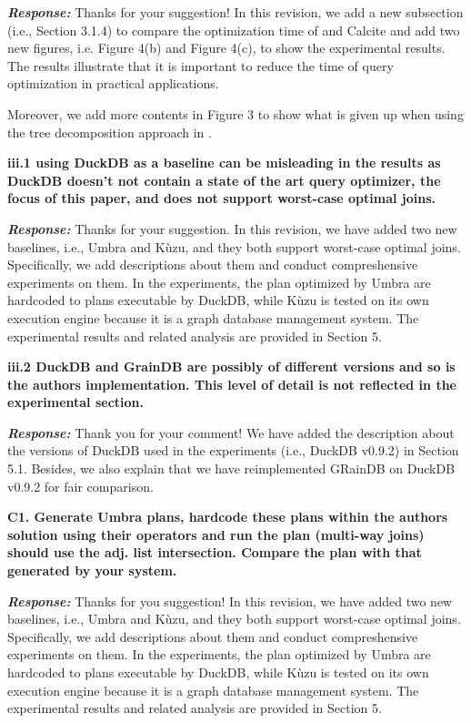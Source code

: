 \textbf{\textit{Response: }}
Thanks for your suggestion! In this revision, we add a new subsection (i.e., Section 3.1.4) to compare the optimization time of \name and Calcite and add two new figures, i.e. Figure 4(b) and Figure 4(c), to show the experimental results.
The results illustrate that it is important to reduce the time of query optimization in practical applications. 

Moreover, we add more contents in Figure 3 to show what is given up when using the tree decomposition approach in \name.


\textbf{
iii.1 using DuckDB as a baseline can be misleading in the results
as DuckDB doesn't not contain a state of the art query optimizer, the focus of this paper, and does not support worst-case optimal joins.}

\textbf{\textit{Response: }}
Thanks for your suggestion. 
In this revision, we have added two new baselines, i.e., Umbra and K\`uzu, and they both support worst-case optimal joins.
Specifically, we add descriptions about them and conduct compreshensive experiments on them.
In the experiments, the plan optimized by Umbra are hardcoded to plans executable by DuckDB, while K\`uzu is tested on its own execution engine because it is a graph database management system.
The experimental results and related analysis are provided in Section 5.


\textbf{
iii.2 DuckDB and GrainDB are possibly of different versions and so is the authors implementation. This level of detail is not reflected in the experimental section.}

\textbf{\textit{Response: }}
Thank you for your comment! 
We have added the description about the versions of DuckDB used in the experiments (i.e., DuckDB v0.9.2) in Section 5.1.
Besides, we also explain that we have reimplemented GRainDB on DuckDB v0.9.2 for fair comparison.

\textbf{
C1. Generate Umbra plans, hardcode these plans within the authors solution using their operators and run the plan (multi-way joins) should use the adj. list intersection. Compare the plan with that generated by your system. }

\textbf{\textit{Response: }}
Thanks for you suggestion! 
In this revision, we have added two new baselines, i.e., Umbra and K\`uzu, and they both support worst-case optimal joins.
Specifically, we add descriptions about them and conduct compreshensive experiments on them.
In the experiments, the plan optimized by Umbra are hardcoded to plans executable by DuckDB, while K\`uzu is tested on its own execution engine because it is a graph database management system.
The experimental results and related analysis are provided in Section 5.

